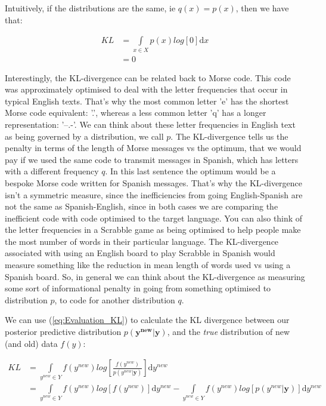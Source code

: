 \documentclass[11pt,fullpage]{book}
\begin{document}
Intuitively, if the distributions are the same, ie $q(x)=p(x)$, then we have that:

\begin{align}
KL &= \int\limits_{x\in X} p(x) log\left[0\right]\mathrm{d}x\\
&= 0
\end{align}

Interestingly, the KL-divergence can be related back to Morse code. This code was approximately optimised to deal with the letter frequencies that occur in typical English texts. That's why the most common letter 'e' has the shortest Morse code equivalent: '.', whereas a less common letter 'q' has a longer representation: '--.-'. We can think about these letter frequencies in English text as being governed by a distribution, we call $p$. The KL-divergence tells us the penalty in terms of the length of Morse messages vs the optimum, that we would pay if we used the same code to transmit messages in Spanish, which has letters with a different frequency $q$. In this last sentence the optimum would be a bespoke Morse code written for Spanish messages. That's why the KL-divergence isn't a symmetric measure, since the inefficiencies from going English-Spanish are not the same as Spanish-English, since in both cases we are comparing the inefficient code with code optimised to the target language. You can also think of the letter frequencies in a Scrabble game as being optimised to help people make the most number of words in their particular language. The KL-divergence associated with using an English board to play Scrabble in Spanish would measure something like the reduction in mean length of words used vs using a Spanish board. So, in general we can think about the KL-divergence as measuring some sort of informational penalty in going from something optimised to distribution $p$, to code for another distribution $q$.

We can use (\ref{eq:Evaluation_KL}) to calculate the KL divergence between our posterior predictive distribution $p(\boldsymbol{y^{new}}|\boldsymbol{y})$, and the \textit{true} distribution of new (and old) data $f(y)$:

\begin{align}\label{eq:Evaluation_KLelpdDeriv}
KL &= \int\limits_{y^{new}\in Y} f(y^{new}) log\left[\frac{f(y^{new})}{p(y^{new}|\boldsymbol{y})}\right]\mathrm{d}y^{new}\\
&= \int\limits_{y^{new}\in Y} f(y^{new}) log\left[f(y^{new})\right]\mathrm{d}y^{new} - \int\limits_{y^{new}\in Y} f(y^{new}) log\left[p(y^{new}|\boldsymbol{y})\right]\mathrm{d}y^{new}
\end{align}
\end{document}

